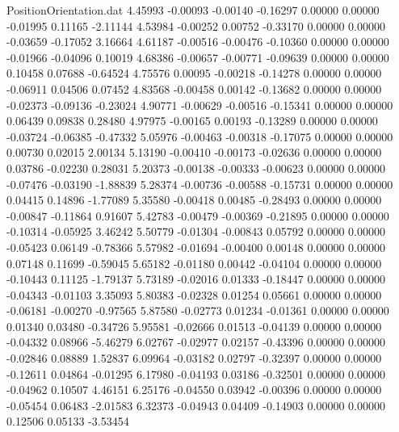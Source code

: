 \begin{filecontents}{PositionOrientation.dat}
   4.45993   -0.00093   -0.00140    -0.16297    0.00000    0.00000   -0.01995    0.11165   -2.11144
   4.53984   -0.00252    0.00752    -0.33170    0.00000    0.00000   -0.03659   -0.17052    3.16664
   4.61187   -0.00516   -0.00476    -0.10360    0.00000    0.00000   -0.01966   -0.04096    0.10019
   4.68386   -0.00657   -0.00771    -0.09639    0.00000    0.00000    0.10458    0.07688   -0.64524
   4.75576    0.00095   -0.00218    -0.14278    0.00000    0.00000   -0.06911    0.04506    0.07452
   4.83568   -0.00458    0.00142    -0.13682    0.00000    0.00000   -0.02373   -0.09136   -0.23024
   4.90771   -0.00629   -0.00516    -0.15341    0.00000    0.00000    0.06439    0.09838    0.28480
   4.97975   -0.00165    0.00193    -0.13289    0.00000    0.00000   -0.03724   -0.06385   -0.47332
   5.05976   -0.00463   -0.00318    -0.17075    0.00000    0.00000    0.00730    0.02015    2.00134
   5.13190   -0.00410   -0.00173    -0.02636    0.00000    0.00000    0.03786   -0.02230    0.28031
   5.20373   -0.00138   -0.00333    -0.00623    0.00000    0.00000   -0.07476   -0.03190   -1.88839
   5.28374   -0.00736   -0.00588    -0.15731    0.00000    0.00000    0.04415    0.14896   -1.77089
   5.35580   -0.00418    0.00485    -0.28493    0.00000    0.00000   -0.00847   -0.11864    0.91607
   5.42783   -0.00479   -0.00369    -0.21895    0.00000    0.00000   -0.10314   -0.05925    3.46242
   5.50779   -0.01304   -0.00843     0.05792    0.00000    0.00000   -0.05423    0.06149   -0.78366
   5.57982   -0.01694   -0.00400     0.00148    0.00000    0.00000    0.07148    0.11699   -0.59045
   5.65182   -0.01180    0.00442    -0.04104    0.00000    0.00000   -0.10443    0.11125   -1.79137
   5.73189   -0.02016    0.01333    -0.18447    0.00000    0.00000   -0.04343   -0.01103    3.35093
   5.80383   -0.02328    0.01254     0.05661    0.00000    0.00000   -0.06181   -0.00270   -0.97565
   5.87580   -0.02773    0.01234    -0.01361    0.00000    0.00000    0.01340    0.03480   -0.34726
   5.95581   -0.02666    0.01513    -0.04139    0.00000    0.00000   -0.04332    0.08966   -5.46279
   6.02767   -0.02977    0.02157    -0.43396    0.00000    0.00000   -0.02846    0.08889    1.52837
   6.09964   -0.03182    0.02797    -0.32397    0.00000    0.00000   -0.12611    0.04864   -0.01295
   6.17980   -0.04193    0.03186    -0.32501    0.00000    0.00000   -0.04962    0.10507    4.46151
   6.25176   -0.04550    0.03942    -0.00396    0.00000    0.00000   -0.05454    0.06483   -2.01583
   6.32373   -0.04943    0.04409    -0.14903    0.00000    0.00000    0.12506    0.05133   -3.53454

\end{filecontents}
